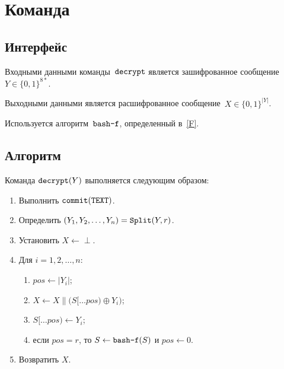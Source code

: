 \section{Команда }\label{PRG.Decrypt}

\subsection{Интерфейс}\label{PRG.Decrypt.IFace}

Входными данными команды~$\texttt{decrypt}$ является зашифрованное 
сообщение~$Y\in\{0,1\}^{8*}$.

Выходными данными является расшифрованное сообщение~$X\in\{0,1\}^{|Y|}$.

Используется алгоритм~$\texttt{bash-f}$, определенный в~\ref{F}.

\subsection{Алгоритм}\label{PRG.Decrypt.Alg}

Команда $\texttt{decrypt}(Y)$ выполняется следующим образом:
\begin{enumerate}
\item
Выполнить
$\texttt{commit}(\texttt{TEXT})$.
\item
Определить
$(Y_1,Y_2,\ldots,Y_n)=\mathop{\texttt{Split}}\nolimits(Y,r)$.
\item
Установить
$X\leftarrow\perp$.
\item
Для $i=1,2,\ldots,n$:
\begin{enumerate}
\item
$pos\leftarrow |Y_i|$;
\item
$X\leftarrow X\parallel\bigl(S[\dots pos)\oplus Y_i\bigr)$;
\item
$S[\dots pos)\leftarrow Y_i$;
\item
если $pos=r$, то $S\leftarrow\texttt{bash-f}(S)$ и $pos\leftarrow 0$.
\end{enumerate}
\item
Возвратить $X$.
\end{enumerate}
